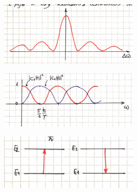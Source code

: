 \documentclass[10pt,oneside]{CBFT_book}
\begin{document}
	\includegraphics[width=0.5\textwidth]{images/fig_ft2_scattering_section_p1.jpg}
	
	\includegraphics[width=0.5\textwidth]{images/fig_ft2_scattering_section_p2.jpg}
	
	\includegraphics[width=0.5\textwidth]{images/fig_ft2_scattering_section_p3.jpg}



\end{document}
